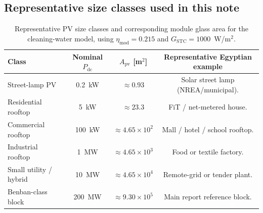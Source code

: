 \documentclass[11pt,a4paper]{article}
\begin{document}
\subsection{Representative size classes used in this note}
\begin{table}[h]
\centering
\caption{Representative PV size classes and corresponding module glass area for the cleaning-water model, using $\eta_{\mathrm{mod}}=0.215$ and $G_{\mathrm{STC}}=1000$~W/m$^2$.}
\begin{tabular}{@{}lccc@{}}
\toprule
\textbf{Class} & \textbf{Nominal $P_{\mathrm{dc}}$} & \textbf{$A_{\mathrm{pv}}$ [m$^2$]} & \textbf{Representative Egyptian example} \\
\midrule
Street-lamp PV           & 0.2~kW  & $\approx 0.93$                & Solar street lamp (NREA/municipal). \\
Residential rooftop      & 5~kW    & $\approx 23.3$                & FiT / net-metered house. \\
Commercial rooftop       & 100~kW  & $\approx 4.65\times 10^{2}$   & Mall / hotel / school rooftop. \\
Industrial rooftop       & 1~MW    & $\approx 4.65\times 10^{3}$   & Food or textile factory. \\
Small utility / hybrid   & 10~MW   & $\approx 4.65\times 10^{4}$   & Remote-grid or tender plant. \\
Benban-class block       & 200~MW  & $\approx 9.30\times 10^{5}$   & Main report reference block. \\
\bottomrule
\end{tabular}
\label{tab:size_classes}
\end{table}
\end{document}
